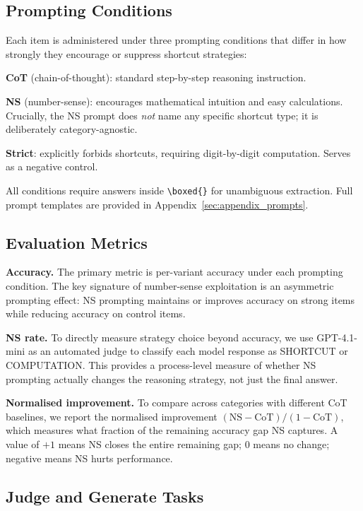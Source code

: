 \subsection{Prompting Conditions}
\label{sec:conditions}

Each item is administered under three prompting conditions that differ in how strongly they encourage or suppress shortcut strategies:

\textbf{CoT} (chain-of-thought): standard step-by-step reasoning instruction.

\textbf{NS} (number-sense): encourages mathematical intuition and easy calculations. Crucially, the NS prompt does \emph{not} name any specific shortcut type; it is deliberately category-agnostic.

\textbf{Strict}: explicitly forbids shortcuts, requiring digit-by-digit computation. Serves as a negative control.

All conditions require answers inside \texttt{\textbackslash boxed\{\}} for unambiguous extraction. Full prompt templates are provided in Appendix~\ref{sec:appendix_prompts}.

\subsection{Evaluation Metrics}
\label{sec:metrics}

\textbf{Accuracy.} The primary metric is per-variant accuracy under each prompting condition. The key signature of number-sense exploitation is an asymmetric prompting effect: NS prompting maintains or improves accuracy on strong items while reducing accuracy on control items.

\textbf{NS rate.} To directly measure strategy choice beyond accuracy, we use GPT-4.1-mini as an automated judge to classify each model response as SHORTCUT or COMPUTATION. This provides a process-level measure of whether NS prompting actually changes the reasoning strategy, not just the final answer.

\textbf{Normalised improvement.} To compare across categories with different CoT baselines, we report the normalised improvement $(\text{NS} - \text{CoT}) / (1 - \text{CoT})$, which measures what fraction of the remaining accuracy gap NS captures. A value of $+1$ means NS closes the entire remaining gap; $0$ means no change; negative means NS hurts performance.

\subsection{Judge and Generate Tasks}
\label{sec:judge_gen}

